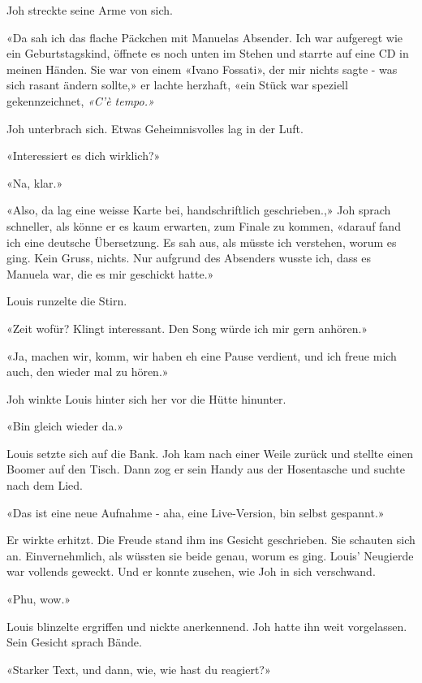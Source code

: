 Joh streckte seine Arme von sich.

«Da sah ich das flache Päckchen mit Manuelas Absender. Ich war aufgeregt
wie ein Geburtstagskind, öffnete es noch unten im Stehen und starrte auf
eine CD in meinen Händen. Sie war von einem «Ivano Fossati», der
mir nichts sagte - was sich rasant ändern sollte,» er lachte herzhaft,
«ein Stück war speziell gekennzeichnet, \emph{«C’è tempo.»}

Joh unterbrach sich. Etwas Geheimnisvolles lag in der Luft.

«Interessiert es dich wirklich?»

«Na, klar.»

«Also, da lag eine weisse Karte bei, handschriftlich geschrieben.,» Joh
sprach schneller, als könne er es kaum erwarten, zum Finale zu kommen,
«darauf fand ich eine deutsche Übersetzung. Es sah aus, als müsste ich
verstehen, worum es ging. Kein Gruss, nichts. Nur aufgrund des Absenders
wusste ich, dass es Manuela war, die es mir geschickt hatte.»

Louis runzelte die Stirn.

«Zeit wofür? Klingt interessant. Den Song würde ich mir gern anhören.»

«Ja, machen wir, komm, wir haben eh eine Pause verdient, und ich freue mich
auch, den wieder mal zu hören.»

Joh winkte Louis hinter sich her vor die Hütte hinunter.

«Bin gleich wieder da.»

Louis setzte sich auf die Bank. Joh kam nach einer Weile zurück und
stellte einen Boomer auf den Tisch. Dann zog er sein Handy aus der
Hosentasche und suchte nach dem Lied.

«Das ist eine neue Aufnahme - aha, eine Live-Version, bin selbst
gespannt.»

Er wirkte erhitzt. Die Freude stand ihm ins Gesicht geschrieben. Sie
schauten sich an. Einvernehmlich, als wüssten sie beide genau, worum es ging. Louis’ Neugierde war vollends geweckt.
Und er konnte zusehen, wie Joh in sich verschwand.


«Phu, wow.»

Louis blinzelte ergriffen und nickte anerkennend.
Joh hatte ihn weit vorgelassen. Sein Gesicht sprach Bände. 

«Starker Text, und dann, wie, wie hast du reagiert?»

